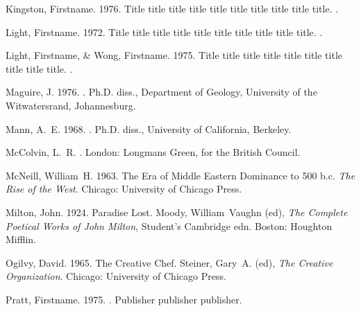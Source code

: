\begin{thebibliography}{}
Kingston, Firstname. 1976.
\newblock Title title title title title title title title title title.
.

Light, Firstname. 1972.
\newblock Title title title title title title title title title title.
.

Light, Firstname, \& Wong, Firstname. 1975.
\newblock Title title title title title title title title title title.
.

Maguire, J. 1976.
.
\newblock Ph.D. diss., Department of Geology, University of the Witwatersrand,
  Johannesburg.

Mann, A.~E. 1968.
.
\newblock Ph.D. diss., University of California, Berkeley.

McColvin, L.~R.
.
\newblock London: {Longmans Green, for the British Council}.

McNeill, William~H. 1963.
\newblock The Era of {Middle Eastern} Dominance to 500 {\sc b.c.}
 {\em The Rise of the {West}}.
\newblock Chicago: {University of Chicago Press}.

Milton, John. 1924.
\newblock Paradise Lost.
 Moody, William~Vaughn (ed), {\em The Complete Poetical
  Works of {John Milton}}, {Student's Cambridge} edn.
\newblock Boston: Houghton Mifflin.

Ogilvy, David. 1965.
\newblock The Creative Chef.
 Steiner, Gary~A. (ed), {\em The Creative
  Organization}.
\newblock Chicago: University of Chicago Press.

Pratt, Firstname. 1975.
.
\newblock Publisher publisher publisher.


\end{thebibliography}
